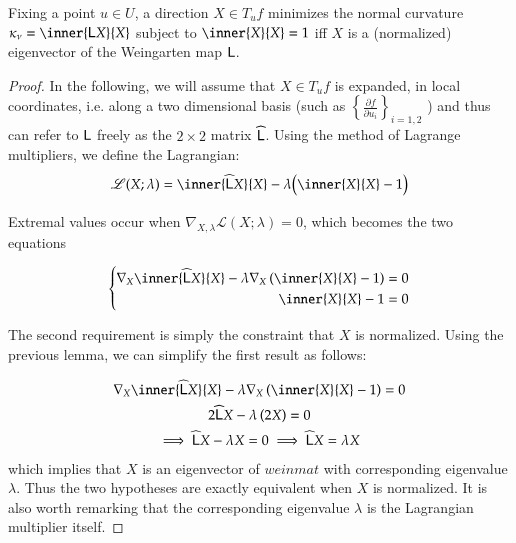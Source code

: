         \begin{theorem}
        	Fixing a point $u \in U$, a direction $X \in T_u f $ minimizes the normal curvature $\kappa_\nu = \inner{\wein X}{X}$ subject to $\inner{X}{X}= 1$
        	iff $X$ is a (normalized) eigenvector of the Weingarten map $\mathsf{L}$.
        	\end{theorem}
        \begin{proof}
        		
        		In the following, we will assume that $X \in T_u f$ is expanded,
        		in local coordinates, i.e. along  a two dimensional basis
        		(such as $\left\{ \frac{\partial f}{\partial u_i}\right\}_{i=1,2}$
        		) and thus can refer to $\mathsf{L}$ freely as the $2\times2$ matrix $\widehat{\mathsf{L}}$.
        		Using the method of Lagrange multipliers, we define the Lagrangian:
        		\begin{equation}
        		\mathscr{L}(X; \lambda) =
	        	\inner{\weinmat X}{X} - \lambda\Big(\inner{X}{X} - 1\Big) 
	        \end{equation}
	        	
	        	Extremal values occur when
	        	$\nabla_{X,\lambda} \mathscr{L}(X;\lambda) = 0$,
	        	which becomes the two equations
	        	
	        \begin{equation}
	        \left\{ \begin{aligned}
		        \nabla_X \inner{\weinmat X}{X} - \lambda \nabla_X \left( \inner{X}{X} - 1 \right) = 0 \\
		        \inner{X}{X} - 1 = 0
	        \end{aligned} \right.
	        \end{equation}
	        
	        The second requirement is simply the constraint that $X$ is normalized.
	        Using the previous lemma, we can simplify the first result as follows:
	        
	        \begin{gather}
	        \nabla_X \inner{\weinmat X}{X} - \lambda \nabla_X \left( \inner{X}{X} - 1 \right) = 0 \\
	        2\weinmat X - \lambda \left(2 X \right) = 0 \\
	        \implies \weinmat X - \lambda X = 0 \implies \weinmat X = \lambda X
	        \end{gather}
	        which implies that $X$ is an eigenvector of  $weinmat$ with corresponding eigenvalue $\lambda$.
	        Thus the two hypotheses are exactly equivalent when $X$ is normalized. It is also worth remarking that the corresponding eigenvalue $\lambda$ is the Lagrangian multiplier itself.
        	\end{proof}
        	
